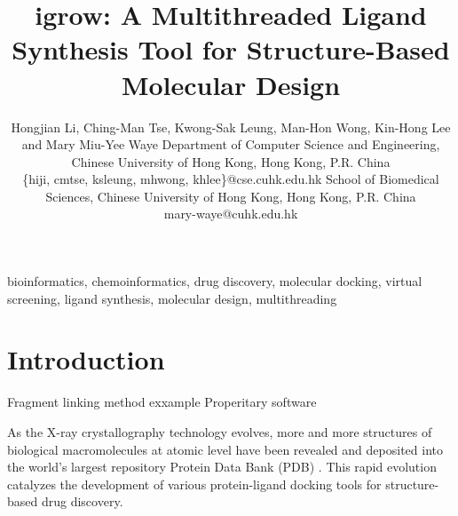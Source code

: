 \documentclass[10pt, conference, compsocconf]{IEEEtran}
\begin{document}
\title{igrow: A Multithreaded Ligand Synthesis Tool for Structure-Based Molecular Design} %
\author
{
\IEEEauthorblockN
{
Hongjian Li, Ching-Man Tse, Kwong-Sak Leung, Man-Hon Wong, Kin-Hong Lee and Mary Miu-Yee Waye
\IEEEauthorblockA
{
Department of Computer Science and Engineering, Chinese University of Hong Kong, Hong Kong, P.R. China\\
\{hiji, cmtse, ksleung, mhwong, khlee\}@cse.cuhk.edu.hk
}
\IEEEauthorblockA
{
School of Biomedical Sciences, Chinese University of Hong Kong, Hong Kong, P.R. China\\
mary-waye@cuhk.edu.hk
}
}
}
\maketitle

\begin{abstract}



\end{abstract}

\begin{IEEEkeywords}

bioinformatics, chemoinformatics, drug discovery, molecular docking, virtual screening, ligand synthesis, molecular design, multithreading

\end{IEEEkeywords}

\section{Introduction}

Fragment linking method exxample \citep{An Ab Initio Method for Designing Multi-Target Specific Pharmacophores using Complementary Interaction Field of Aspartic Proteases}
Properitary software \citep{Incorporating Virtual Reactions into a Logic-Based Ligand-Based Virtual Screening Method to Discover New Leads}

As the X-ray crystallography technology evolves, more and more structures of biological macromolecules at atomic level have been revealed and deposited into the world's largest repository Protein Data Bank (PDB) \cite{539,537}. This rapid evolution catalyzes the development of various protein-ligand docking tools for structure-based drug discovery.
\end{document}

